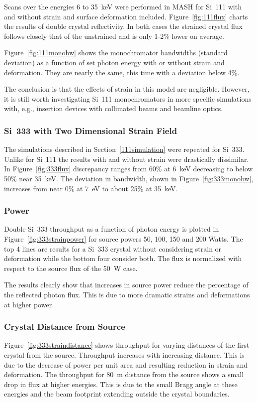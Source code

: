 \documentclass[preprint]{iucr}              %
\begin{document}
Scans over the energies 6 to 35~keV were performed in MASH for Si~111 with and without strain and surface deformation included. Figure~\ref{fig:111flux} charts the results of double crystal reflectivity. In both cases the strained crystal flux follows closely that of the unstrained and is only 1-2\% lower on average.

Figure~\ref{fig:111monobw} shows the monochromator bandwidths (standard deviation) as a function of set photon energy with or without strain and deformation. They are nearly the same, this time with a deviation below 4\%.

The conclusion is that the effects of strain in this model are negligible. However, it is still worth investigating Si~111 monochromators in more specific simulations with, e.g., insertion devices with collimated beams and beamline optics.



\subsubsection{Si~333 with Two Dimensional Strain Field}\label{parameterscans}

The simulations described in Section~\ref{111simulation} were repeated for Si~333. Unlike for Si~111 the results with and without strain were drastically dissimilar. In Figure~\ref{fig:333flux} discrepancy ranges from 60\% at 6~keV decreasing to below 50\% near 35~keV. The deviation in bandwidth, shown in Figure~\ref{fig:333monobw}, increases from near 0\% at 7~eV to about 25\% at 35~keV.


\subsubsection{Power}
Double Si~333 throughput as a function of photon energy is plotted in Figure~\ref{fig:333strainpower} for source powers 50, 100, 150 and 200 Watts. The top 4 lines are results for a Si~333 crystal without considering strain or deformation while the bottom four consider both. The flux is normalized with respect to the source flux of the 50~W case.

The results clearly show that increases in source power reduce the percentage of the reflected photon flux. This is due to more dramatic strains and deformations at higher power.

\subsubsection{Crystal Distance from Source}
Figure~\ref{fig:333straindistance} shows throughput for varying distances of the first crystal from the source. Throughput increases with increasing distance. This is due to the decrease of power per unit area and resulting reduction in strain and deformation. The throughput for 80~m distance from the source shows a small drop in flux at higher energies. This is due to the small Bragg angle at these energies and the beam footprint extending outside the crystal boundaries.
\end{document}
